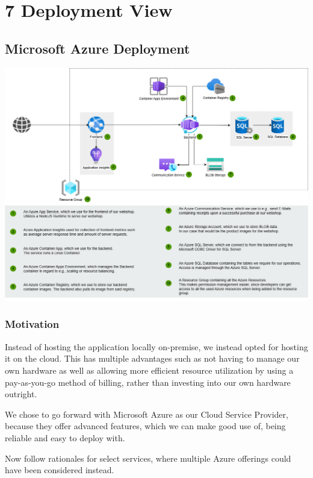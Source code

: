 \hypertarget{section-deployment-view}{%
\section{7 Deployment View}\label{section-deployment-view}}

\hypertarget{_infrastructure_level_1}{%
\subsection{Microsoft Azure Deployment}\label{_infrastructure_level_1}}

\includegraphics{images/azure_deployment_view.png}

\subsubsection{Motivation}
Instead of hosting the application locally on-premise, we instead opted for hosting it on the cloud.
This has multiple advantages such as not having to manage our own hardware as well as allowing more efficient resource utilization
by using a pay-as-you-go method of billing, rather than investing into our own hardware outright.

We chose to go forward with Microsoft Azure as our Cloud Service Provider, because they offer advanced features,
which we can make good use of, 
 being reliable and easy to deploy with.

Now follow rationales for select services, where multiple Azure offerings could have been considered instead.

